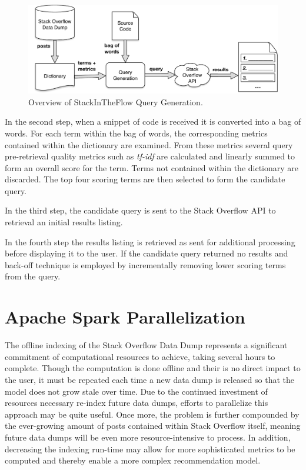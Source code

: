 \documentclass[conference]{IEEEtran}
\newcommand{\so}{Stack Overflow\xspace}
\newcommand{\sitf}{{\sc StackInTheFlow}\xspace}
\begin{document}
\begin{figure}[ht]
	\centering
	\caption{Overview of \sitf Query Generation.}
 	\label{fig:overview}
 	\includegraphics[width=.75\linewidth]{query-gen.pdf}
\end{figure}

In the second step, when a snippet of code is received it is converted into a bag of words.  For each term within the bag of words, the corresponding metrics contained within the dictionary are examined. From these metrics several query pre-retrieval quality metrics such as \textit{tf-idf} are calculated and linearly summed to form an overall score for the term. Terms not contained within the dictionary are discarded. The top four scoring terms are then selected to form the candidate query.

In the third step, the candidate query is sent to the \so API to retrieval an initial results listing.

In the fourth step the results listing is retrieved as sent for additional processing before displaying it to the user.  If the candidate query returned no results and back-off technique is employed by incrementally removing lower scoring terms from the query.

\section{Apache Spark Parallelization}
The offline indexing of the \so Data Dump represents a significant commitment of computational resources to achieve, taking several hours to complete.  Though the computation is done offline and their is no direct impact to the user, it must be repeated each time a new data dump is released so that the model does not grow stale over time.  Due to the continued investment of resources necessary re-index future data dumps, efforts to parallelize this approach may be quite useful. Once more, the problem is further compounded by the ever-growing amount of posts contained within \so itself, meaning future data dumps will be even more resource-intensive to process.  In addition, decreasing the indexing run-time may allow for more sophisticated metrics to be computed and thereby enable a more complex recommendation model.
\end{document}
